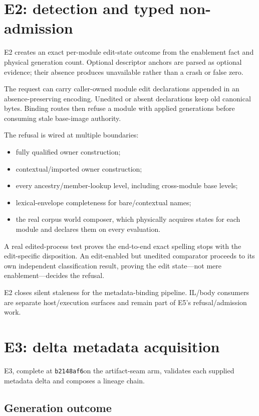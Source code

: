 \documentclass[11pt,oneside,openany]{book}
\newcommand{\shortcommit}{\texttt{b2148af6}}
\begin{document}
\section{E2: detection and typed non-admission}

E2 creates an exact per-module edit-state outcome from the enablement fact and physical generation count. Optional descriptor anchors are parsed as optional evidence; their absence produces unavailable rather than a crash or false zero.

The request can carry caller-owned module edit declarations appended in an absence-preserving encoding. Unedited or absent declarations keep old canonical bytes. Binding routes then refuse a module with applied generations before consuming stale base-image authority.

The refusal is wired at multiple boundaries:

\begin{itemize}
  \item fully qualified owner construction;
  \item contextual/imported owner construction;
  \item every ancestry/member-lookup level, including cross-module base levels;
  \item lexical-envelope completeness for bare/contextual names;
  \item the real corpus world composer, which physically acquires states for each module and declares them on every evaluation.
\end{itemize}

A real edited-process test proves the end-to-end exact spelling stops with the edit-specific disposition. An edit-enabled but unedited comparator proceeds to its own independent classification result, proving the edit state---not mere enablement---decides the refusal.

E2 closes silent staleness for the metadata-binding pipeline. IL/body consumers are separate host/execution surfaces and remain part of E5's refusal/admission work.

\section{E3: delta metadata acquisition}

E3, complete at \shortcommit on the artifact-seam arm, validates each supplied metadata delta and composes a lineage chain.

\subsection{Generation outcome}
\end{document}
